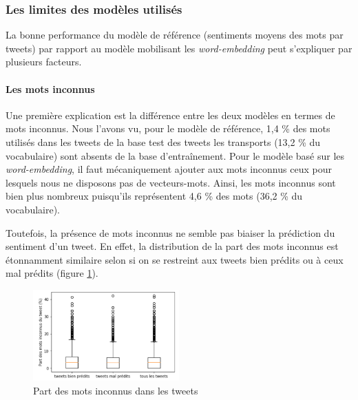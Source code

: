 \documentclass[11pt,french,french]{article}
\begin{document}
\hypertarget{les-limites-des-moduxe8les-utilisuxe9s}{%
\subsubsection{Les limites des modèles utilisés}\label{les-limites-des-moduxe8les-utilisuxe9s}}

La bonne performance du modèle de référence (sentiments moyens des mots par tweets) par rapport au modèle mobilisant les \emph{word-embedding} peut s'expliquer par plusieurs facteurs.

\hypertarget{les-mots-inconnus}{%
\paragraph{Les mots inconnus}\label{les-mots-inconnus}}

Une première explication est la différence entre les deux modèles en termes de mots inconnus.
Nous l'avons vu, pour le modèle de référence, 1,4 \% des mots utilisés dans les tweets de la base test des tweets les transports (13,2 \% du vocabulaire) sont absents de la base d'entraînement.
Pour le modèle basé sur les \emph{word-embedding}, il faut mécaniquement ajouter aux mots inconnus ceux pour lesquels nous ne disposons pas de vecteurs-mots.
Ainsi, les mots inconnus sont bien plus nombreux puisqu'ils représentent 4,6 \% des mots (36,2 \% du vocabulaire).

Toutefois, la présence de mots inconnus ne semble pas biaiser la prédiction du sentiment d'un tweet.
En effet, la distribution de la part des mots inconnus est étonnamment similaire selon si on se restreint aux tweets bien prédits ou à ceux mal prédits (figure \ref{fig:mots_inconnus}).

\begin{figure}[ht]
\begin{center}
\includegraphics[width=0.5\textwidth]{img/mots_inconnus.png}
\captionsetup{margin=0cm,format=hang,justification=justified}
\caption{Part des mots inconnus dans les tweets}\label{fig:mots_inconnus}
\end{center}
\end{figure}
\end{document}
